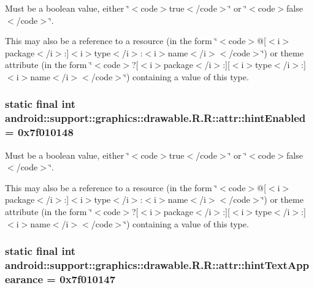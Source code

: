 Must be a boolean value, either \char`\"{}$<$code$>$true$<$/code$>$\char`\"{} or \char`\"{}$<$code$>$false$<$/code$>$\char`\"{}. 

This may also be a reference to a resource (in the form \char`\"{}$<$code$>$@\mbox{[}$<$i$>$package$<$/i$>$:\mbox{]}$<$i$>$type$<$/i$>$:$<$i$>$name$<$/i$>$$<$/code$>$\char`\"{}) or theme attribute (in the form \char`\"{}$<$code$>$?\mbox{[}$<$i$>$package$<$/i$>$:\mbox{]}\mbox{[}$<$i$>$type$<$/i$>$:\mbox{]}$<$i$>$name$<$/i$>$$<$/code$>$\char`\"{}) containing a value of this type. \hypertarget{classandroid_1_1support_1_1graphics_1_1drawable_1_1_r_1_1attr_471a77c82a731adadc0e8937f66f6f88}{
\subsubsection[{hintEnabled}]{\setlength{\rightskip}{0pt plus 5cm}static final int android::support::graphics::drawable.R.R::attr::hintEnabled = 0x7f010148}}
\label{classandroid_1_1support_1_1graphics_1_1drawable_1_1_r_1_1attr_471a77c82a731adadc0e8937f66f6f88}


Must be a boolean value, either \char`\"{}$<$code$>$true$<$/code$>$\char`\"{} or \char`\"{}$<$code$>$false$<$/code$>$\char`\"{}. 

This may also be a reference to a resource (in the form \char`\"{}$<$code$>$@\mbox{[}$<$i$>$package$<$/i$>$:\mbox{]}$<$i$>$type$<$/i$>$:$<$i$>$name$<$/i$>$$<$/code$>$\char`\"{}) or theme attribute (in the form \char`\"{}$<$code$>$?\mbox{[}$<$i$>$package$<$/i$>$:\mbox{]}\mbox{[}$<$i$>$type$<$/i$>$:\mbox{]}$<$i$>$name$<$/i$>$$<$/code$>$\char`\"{}) containing a value of this type. \hypertarget{classandroid_1_1support_1_1graphics_1_1drawable_1_1_r_1_1attr_edce01b269b72f97c586b3fa6b439d87}{
\subsubsection[{hintTextAppearance}]{\setlength{\rightskip}{0pt plus 5cm}static final int android::support::graphics::drawable.R.R::attr::hintTextAppearance = 0x7f010147}}
\label{classandroid_1_1support_1_1graphics_1_1drawable_1_1_r_1_1attr_edce01b269b72f97c586b3fa6b439d87}


